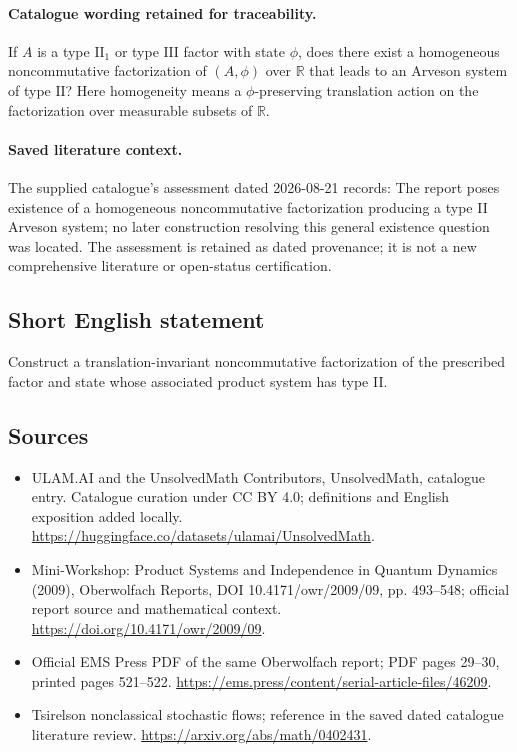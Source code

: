 \documentclass[11pt]{article}
\begin{document}
\paragraph{Catalogue wording retained for traceability.}
If $A$ is a type $\mathrm{II}_1$ or type $\mathrm{III}$ factor with state $\phi$, does there exist a homogeneous noncommutative factorization of $(A,\phi)$ over $\mathbb R$ that leads to an Arveson system of type $\mathrm{II}$? Here homogeneity means a $\phi$-preserving translation action on the factorization over measurable subsets of $\mathbb R$.

\paragraph{Saved literature context.} The supplied catalogue's assessment dated 2026-08-21 records: The report poses existence of a homogeneous noncommutative factorization producing a type II Arveson system; no later construction resolving this general existence question was located. The assessment is retained as dated provenance; it is not a new comprehensive literature or open-status certification.
\subsection{Short English statement}
Construct a translation-invariant noncommutative factorization of the prescribed factor and state whose associated product system has type II.
\subsection{Sources}
\begin{itemize}
\item[\hypertarget{source:statement:1}{S1}] ULAM.AI and the UnsolvedMath Contributors, UnsolvedMath, catalogue entry. Catalogue curation under CC BY 4.0; definitions and English exposition added locally.
\url{https://huggingface.co/datasets/ulamai/UnsolvedMath}.
\item[\hypertarget{source:statement:2}{S2}] Mini-Workshop: Product Systems and Independence in Quantum Dynamics (2009), Oberwolfach Reports, DOI 10.4171/owr/2009/09, pp. 493--548; official report source and mathematical context.
\url{https://doi.org/10.4171/owr/2009/09}.
\item[\hypertarget{source:statement:3}{S3}] Official EMS Press PDF of the same Oberwolfach report; PDF pages 29--30, printed pages 521--522.
\url{https://ems.press/content/serial-article-files/46209}.
\item[\hypertarget{source:statement:4}{S4}] Tsirelson nonclassical stochastic flows; reference in the saved dated catalogue literature review.
\url{https://arxiv.org/abs/math/0402431}.
\end{itemize}
\label{end:statement}
\end{document}
